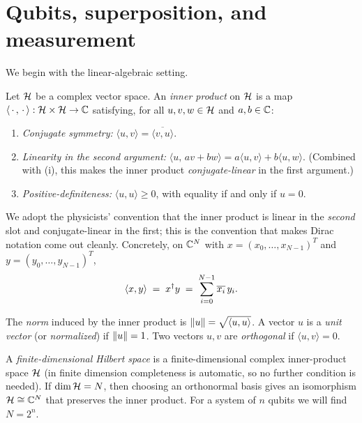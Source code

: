 \section{Qubits, superposition, and measurement}
\label{sec:lec01-1}

We begin with the linear-algebraic setting.

\begin{definition}\label{def:lec01-inner}
Let $\mathcal{H}$ be a complex vector space. An \emph{inner product} on $\mathcal{H}$ is a map
$\langle\,\cdot\,,\,\cdot\,\rangle:\mathcal{H}\times\mathcal{H}\to\mathbb{C}$ satisfying, for all
$u,v,w\in\mathcal{H}$ and $a,b\in\mathbb{C}$:
\begin{enumerate}[label=(\roman*)]
  \item \emph{Conjugate symmetry:} $\langle u,v\rangle=\overline{\langle v,u\rangle}$.
  \item \emph{Linearity in the second argument:}
        $\langle u,\,a v+b w\rangle=a\langle u,v\rangle+b\langle u,w\rangle$.
        (Combined with (i), this makes the inner product \emph{conjugate-linear}
        in the first argument.)
  \item \emph{Positive-definiteness:} $\langle u,u\rangle\ge 0$, with equality
        if and only if $u=0$.
\end{enumerate}
\end{definition}

We adopt the physicists' convention that the inner product is linear in the
\emph{second} slot and conjugate-linear in the first; this is the convention that
makes Dirac notation come out cleanly. Concretely, on $\mathbb{C}^{N}$ with
$x=(x_0,\dots,x_{N-1})^{T}$ and $y=(y_0,\dots,y_{N-1})^{T}$,
\begin{equation}
  \langle x,y\rangle \;=\; x^{\dagger} y \;=\; \sum_{i=0}^{N-1}\overline{x_i}\,y_i .
\end{equation}

\begin{definition}\label{def:lec01-norm}
The \emph{norm} induced by the inner product is $\left\lVert u \right\rVert=\sqrt{\langle u,u\rangle}$.
A vector $u$ is a \emph{unit vector} (or \emph{normalized}) if $\left\lVert u \right\rVert=1$. Two
vectors $u,v$ are \emph{orthogonal} if $\langle u,v\rangle=0$.
\end{definition}

\begin{definition}\label{def:lec01-hilbert}
A \emph{finite-dimensional Hilbert space} is a finite-dimensional complex
inner-product space $\mathcal{H}$ (in finite dimension completeness is automatic, so no
further condition is needed). If $\dim\mathcal{H}=N$, then choosing an orthonormal basis
gives an isomorphism $\mathcal{H}\cong\mathbb{C}^{N}$ that preserves the inner product. For a
system of $n$ qubits we will find $N=2^{n}$.
\end{definition}

